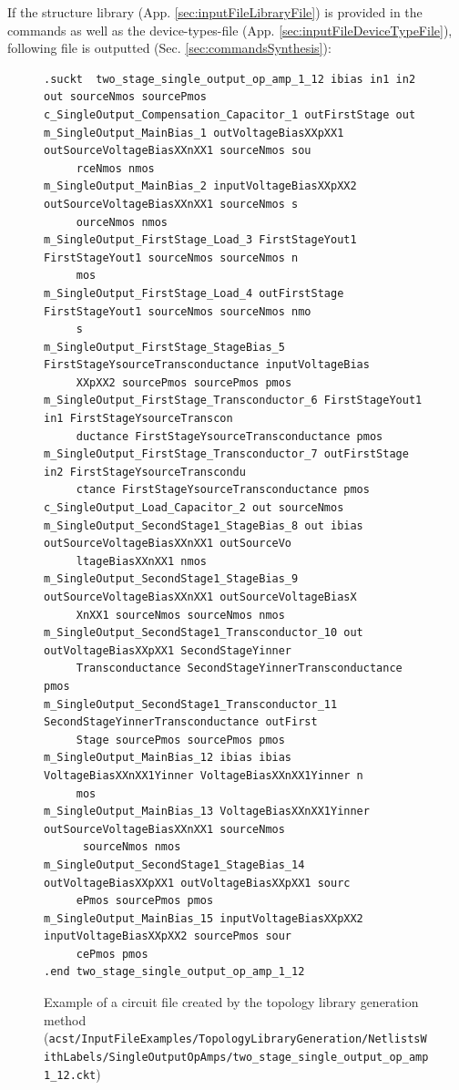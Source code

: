If the structure library (App. \ref{sec:inputFileLibraryFile}) is provided in the commands as well as the device-types-file (App. \ref{sec:inputFileDeviceTypeFile}), following file is outputted (Sec. \ref{sec:commandsSynthesis}):
\begin{figure}[H]
	\begin{lstlisting}[basicstyle=\ttfamily\scriptsize,backgroundcolor={\color{gray!30}}, escapechar=? ]
.suckt  two_stage_single_output_op_amp_1_12 ibias in1 in2 out sourceNmos sourcePmos
c_SingleOutput_Compensation_Capacitor_1 outFirstStage out 
m_SingleOutput_MainBias_1 outVoltageBiasXXpXX1 outSourceVoltageBiasXXnXX1 sourceNmos sou
     rceNmos nmos
m_SingleOutput_MainBias_2 inputVoltageBiasXXpXX2 outSourceVoltageBiasXXnXX1 sourceNmos s
     ourceNmos nmos
m_SingleOutput_FirstStage_Load_3 FirstStageYout1 FirstStageYout1 sourceNmos sourceNmos n
     mos
m_SingleOutput_FirstStage_Load_4 outFirstStage FirstStageYout1 sourceNmos sourceNmos nmo
     s
m_SingleOutput_FirstStage_StageBias_5 FirstStageYsourceTransconductance inputVoltageBias
     XXpXX2 sourcePmos sourcePmos pmos
m_SingleOutput_FirstStage_Transconductor_6 FirstStageYout1 in1 FirstStageYsourceTranscon
     ductance FirstStageYsourceTransconductance pmos
m_SingleOutput_FirstStage_Transconductor_7 outFirstStage in2 FirstStageYsourceTranscondu
     ctance FirstStageYsourceTransconductance pmos
c_SingleOutput_Load_Capacitor_2 out sourceNmos 
m_SingleOutput_SecondStage1_StageBias_8 out ibias outSourceVoltageBiasXXnXX1 outSourceVo
     ltageBiasXXnXX1 nmos
m_SingleOutput_SecondStage1_StageBias_9 outSourceVoltageBiasXXnXX1 outSourceVoltageBiasX
     XnXX1 sourceNmos sourceNmos nmos
m_SingleOutput_SecondStage1_Transconductor_10 out outVoltageBiasXXpXX1 SecondStageYinner
     Transconductance SecondStageYinnerTransconductance pmos
m_SingleOutput_SecondStage1_Transconductor_11 SecondStageYinnerTransconductance outFirst
     Stage sourcePmos sourcePmos pmos
m_SingleOutput_MainBias_12 ibias ibias VoltageBiasXXnXX1Yinner VoltageBiasXXnXX1Yinner n
     mos
m_SingleOutput_MainBias_13 VoltageBiasXXnXX1Yinner outSourceVoltageBiasXXnXX1 sourceNmos
      sourceNmos nmos
m_SingleOutput_SecondStage1_StageBias_14 outVoltageBiasXXpXX1 outVoltageBiasXXpXX1 sourc
     ePmos sourcePmos pmos
m_SingleOutput_MainBias_15 inputVoltageBiasXXpXX2 inputVoltageBiasXXpXX2 sourcePmos sour
     cePmos pmos
.end two_stage_single_output_op_amp_1_12
\end{lstlisting}
\caption{Example of a circuit file created by the topology library generation method ({\tt acst/InputFileExamples/TopologyLibraryGeneration/NetlistsWith\protect \linebreak Labels/SingleOutputOpAmps/two\_stage\_single\_output\_op\_amp1\_12.ckt})}
\label{fig:outputFileTopologyGenerationWithTransistorLabels}
\end{figure}


